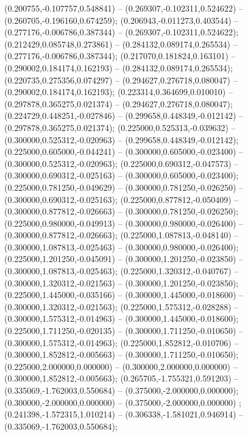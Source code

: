  (0.200755,-0.107757,0.548841) -- (0.269307,-0.102311,0.524622) -- (0.260705,-0.196160,0.674259);
 (0.206943,-0.011273,0.403544) -- (0.277176,-0.006786,0.387344) -- (0.269307,-0.102311,0.524622);
 (0.212429,0.085748,0.273861) -- (0.284132,0.089174,0.265534) -- (0.277176,-0.006786,0.387344);
 (0.217070,0.181824,0.163101) -- (0.290002,0.184174,0.162193) -- (0.284132,0.089174,0.265534);
 (0.220735,0.275356,0.074297) -- (0.294627,0.276718,0.080047) -- (0.290002,0.184174,0.162193);
 (0.223314,0.364699,0.010010) -- (0.297878,0.365275,0.021374) -- (0.294627,0.276718,0.080047);
 (0.224729,0.448251,-0.027846) -- (0.299658,0.448349,-0.012142) -- (0.297878,0.365275,0.021374);
 (0.225000,0.525313,-0.039632) -- (0.300000,0.525312,-0.020963) -- (0.299658,0.448349,-0.012142);
 (0.225000,0.605000,-0.044241) -- (0.300000,0.605000,-0.023400) -- (0.300000,0.525312,-0.020963);
 (0.225000,0.690312,-0.047573) -- (0.300000,0.690312,-0.025163) -- (0.300000,0.605000,-0.023400);
 (0.225000,0.781250,-0.049629) -- (0.300000,0.781250,-0.026250) -- (0.300000,0.690312,-0.025163);
 (0.225000,0.877812,-0.050409) -- (0.300000,0.877812,-0.026663) -- (0.300000,0.781250,-0.026250);
 (0.225000,0.980000,-0.049913) -- (0.300000,0.980000,-0.026400) -- (0.300000,0.877812,-0.026663);
 (0.225000,1.087813,-0.048140) -- (0.300000,1.087813,-0.025463) -- (0.300000,0.980000,-0.026400);
 (0.225000,1.201250,-0.045091) -- (0.300000,1.201250,-0.023850) -- (0.300000,1.087813,-0.025463);
 (0.225000,1.320312,-0.040767) -- (0.300000,1.320312,-0.021563) -- (0.300000,1.201250,-0.023850);
 (0.225000,1.445000,-0.035166) -- (0.300000,1.445000,-0.018600) -- (0.300000,1.320312,-0.021563);
 (0.225000,1.575312,-0.028288) -- (0.300000,1.575312,-0.014963) -- (0.300000,1.445000,-0.018600);
 (0.225000,1.711250,-0.020135) -- (0.300000,1.711250,-0.010650) -- (0.300000,1.575312,-0.014963);
 (0.225000,1.852812,-0.010706) -- (0.300000,1.852812,-0.005663) -- (0.300000,1.711250,-0.010650);
 (0.225000,2.000000,0.000000) -- (0.300000,2.000000,0.000000) -- (0.300000,1.852812,-0.005663);
 (0.265705,-1.755321,0.591203) -- (0.335069,-1.762003,0.550684) -- (0.375000,-2.000000,0.000000);
 (0.300000,-2.000000,0.000000) -- (0.375000,-2.000000,0.000000) ;
 (0.241398,-1.572315,1.010214) -- (0.306338,-1.581021,0.946914) -- (0.335069,-1.762003,0.550684);

